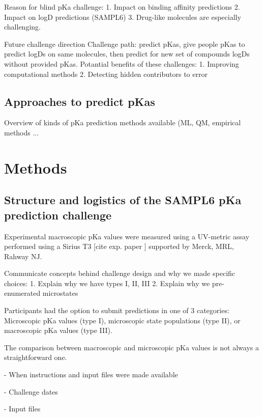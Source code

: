 \documentclass[9pt,lineno,final]{elife}
\begin{document}
Reason for blind pKa challenge:  
1. Impact on binding affinity predictions  
2. Impact on logD predictions (SAMPL6)  
3.  Drug-like molecules are especially challenging.  


Future challenge direction  
Challenge path: predict pKas, give people pKas to predict logDs on same molecules, then predict for new set of compounds logDs without provided pKas.  
Potantial benefits of these challenges:  
1. Improving computational methods  
2. Detecting hidden contributors to error  

\subsection{Approaches to predict pKas}

Overview of kinds of pKa prediction methods available  (ML, QM, empirical methods ... 


\section{Methods}

\subsection{Structure and logistics of the SAMPL6 pKa prediction challenge}

Experimental macroscopic pKa values were measured using a UV-metric assay performed using a Sirius T3 [cite exp. paper ]  supported by Merck, MRL,  Rahway NJ.

Communicate concepts behind challenge design and why we made specific choices:  
1. Explain why we have types I, II, III  
2. Explain why we pre-enumerated microstates  


Participants had the option to submit predictions in one of 3 categories: Microscopic pKa values (type I), microscopic state populations (type II), or macroscopic pKa values (type III).

The comparison between macroscopic and microscopic pKa values is not always a straightforward one. 

- When instructions and input files were made available

- Challenge dates

- Input files
\end{document}

